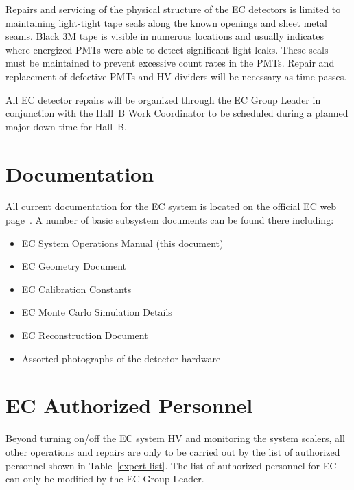 \documentclass[letterpaper,10pt]{article}
\begin{document}
Repairs and servicing of the physical structure of the EC detectors is limited to maintaining
light-tight tape seals along the known openings and sheet metal seams.  Black 3M tape is visible
in numerous locations and usually indicates where energized PMTs were able to detect significant
light leaks.  These seals must be maintained to prevent excessive count rates in the PMTs.  Repair
and replacement of defective PMTs and HV dividers will be necessary as time passes. 

All EC detector repairs will be organized through the EC Group Leader in conjunction with the
Hall~B Work Coordinator to be scheduled during a planned major down time for Hall~B.

\clearpage

\vfil
\eject

\section{Documentation}

All current documentation for the EC system is located on the official EC web page~\cite{ecal-web}. 
A number of basic subsystem documents can be found there including:

\begin{itemize}
\item EC System Operations Manual (this document)
\item EC Geometry Document
\item EC Calibration Constants
\item EC Monte Carlo Simulation Details
\item EC Reconstruction Document
\item Assorted photographs of the detector hardware
\end{itemize}

\section{EC Authorized Personnel}
\label{personnel}

Beyond turning on/off the EC system HV and monitoring the system scalers, all other operations and
repairs are only to be carried out by the list of authorized personnel shown in Table~\ref{expert-list}.
The list of authorized personnel for EC can only be modified by the EC Group Leader.
\end{document}
